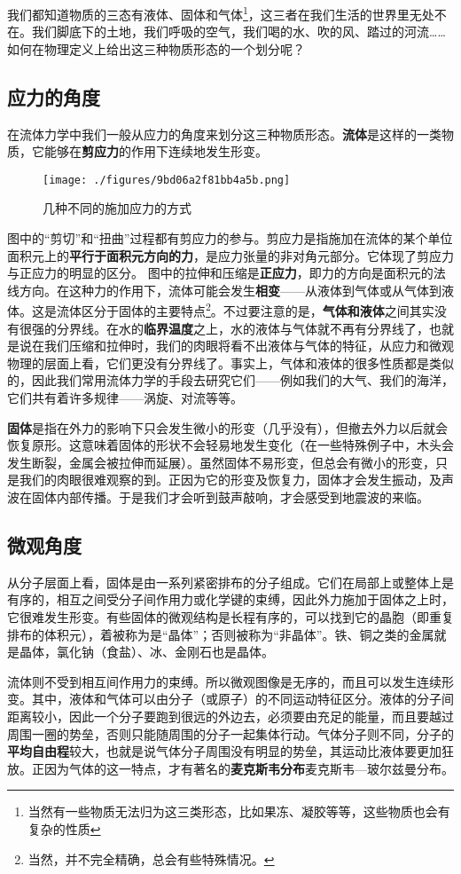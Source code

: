 
我们都知道物质的三态有液体、固体和气体\footnote{当然有一些物质无法归为这三类形态，比如果冻、凝胶等等，这些物质也会有复杂的性质}，这三者在我们生活的世界里无处不在。我们脚底下的土地，我们呼吸的空气，我们喝的水、吹的风、踏过的河流…… 如何在物理定义上给出这三种物质形态的一个划分呢？

\subsection{应力的角度}
在流体力学中我们一般从应力的角度来划分这三种物质形态。\textbf{流体}是这样的一类物质，它能够在\textbf{剪应力}的作用下连续地发生形变。

\begin{figure}[ht]
\centering
\texttt{[image: ./figures/9bd06a2f81bb4a5b.png]}
\caption{几种不同的施加应力的方式} \label{fig_SLG_1}
\end{figure}

图中的“剪切”和“扭曲”过程都有剪应力的参与。剪应力是指施加在流体的某个单位面积元上的\textbf{平行于面积元方向的力}，是应力张量的非对角元部分。它体现了剪应力与正应力的明显的区分。
图中的拉伸和压缩是\textbf{正应力}，即力的方向是面积元的法线方向。在这种力的作用下，流体可能会发生\textbf{相变}——从液体到气体或从气体到液体。这是流体区分于固体的主要特点\footnote{当然，并不完全精确，总会有些特殊情况。}。不过要注意的是，\textbf{气体和液体}之间其实没有很强的分界线。在水的\textbf{临界温度}之上，水的液体与气体就不再有分界线了，也就是说在我们压缩和拉伸时，我们的肉眼将看不出液体与气体的特征，从应力和微观物理的层面上看，它们更没有分界线了。事实上，气体和液体的很多性质都是类似的，因此我们常用流体力学的手段去研究它们——例如我们的大气、我们的海洋，它们共有着许多规律——涡旋、对流等等。

\textbf{固体}是指在外力的影响下只会发生微小的形变（几乎没有），但撤去外力以后就会恢复原形。这意味着固体的形状不会轻易地发生变化（在一些特殊例子中，木头会发生断裂，金属会被拉伸而延展）。虽然固体不易形变，但总会有微小的形变，只是我们的肉眼很难观察的到。正因为它的形变及恢复力，固体才会发生振动，及声波在固体内部传播。于是我们才会听到鼓声敲响，才会感受到地震波的来临。

\subsection{微观角度}
从分子层面上看，固体是由一系列紧密排布的分子组成。它们在局部上或整体上是有序的，相互之间受分子间作用力或化学键的束缚，因此外力施加于固体之上时，它很难发生形变。有些固体的微观结构是长程有序的，可以找到它的晶胞（即重复排布的体积元），着被称为是“晶体”；否则被称为“非晶体”。铁、铜之类的金属就是晶体，氯化钠（食盐）、冰、金刚石也是晶体。

流体则不受到相互间作用力的束缚。所以微观图像是无序的，而且可以发生连续形变。其中，液体和气体可以由分子（或原子）的不同运动特征区分。液体的分子间距离较小，因此一个分子要跑到很远的外边去，必须要由充足的能量，而且要越过周围一圈的势垒，否则只能随周围的分子一起集体行动。气体分子则不同，分子的\textbf{平均自由程}较大，也就是说气体分子周围没有明显的势垒，其运动比液体要更加狂放。正因为气体的这一特点，才有著名的\textbf{麦克斯韦分布}麦克斯韦—玻尔兹曼分布。